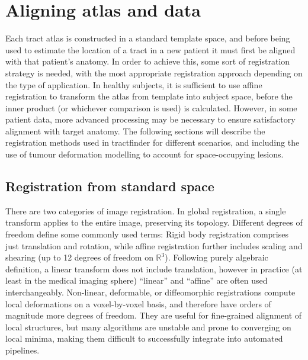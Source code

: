 \chapter{Aligning atlas and data}
\label{chap:reg}

Each tract atlas is constructed in a standard template space, and before being used to estimate the location of a tract in a new patient it must first be aligned with that patient's anatomy.
In order to achieve this, some sort of registration strategy is needed, with the most appropriate registration approach depending on the type of application.
In healthy subjects, it is sufficient to use affine registration to transform the atlas from template into subject space, before the inner product (or whichever comparison is used) is calculated.
However, in some patient data, more advanced processing may be necessary to ensure satisfactory alignment with target anatomy.
The following sections will describe the registration methods used in tractfinder for different scenarios, and including the use of tumour deformation modelling to account for space-occupying lesions.

\section{Registration from standard space}
\label{sec:reg1}

There are two categories of image registration.
In global registration, a single transform applies to the entire image, preserving its topology.
Different degrees of freedom define some commonly used terms:
Rigid body registration comprises just translation and rotation, while affine registration further includes scaling and shearing (up to 12 degrees of freedom on $\mathbb{R}^3$).
Following purely algebraic definition, a linear transform does not include translation, however in practice (at least in the medical imaging sphere) ``linear'' and ``affine'' are often used interchangeably.
Non-linear, deformable, or diffeomorphic registrations compute local deformations on a voxel-by-voxel basis, and therefore have orders of magnitude more degrees of freedom.
They are useful for fine-grained alignment of local structures, but many algorithms are unstable and prone to converging on local minima, making them difficult to successfully integrate into automated pipelines.

